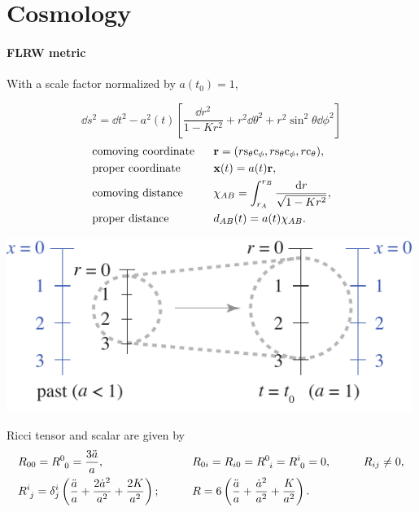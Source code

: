 \documentclass[CheatSheet]{subfiles}
\begin{document}
\summarystyle
\section{Cosmology}
\paragraph{FLRW metric} With a scale factor normalized by $a(t_0)=1$,\\
\begin{minipage}{0.6\textwidth}
\begin{equation}
  \dd s^2 = \dd t^2-a^2(t)\left[
  \frac{\dd r^2}{1-K r^2}+r^2\dd\theta^2+r^2\sin^2\theta\dd\phi^2
\right]
\end{equation}\vspace{-2em}
\begin{alignat*}{2}
  &\text{comoving coordinate~~}&& {\mathbf{r}}=(r\mathrm{s}_{\theta}\mathrm{c}_{\phi},r\mathrm{s}_{\theta}\mathrm{c}_{\phi},r\mathrm{c}_{\theta}),\\
  &\text{proper coordinate~~}&& {\mathbf{x}}(t)=a(t){\mathbf{r}},\\
  &\text{comoving distance~~}&& \chi_{AB}=\int_{r_A}^{r_B}\frac{{\mathrm{d}} r}{\sqrt{1-Kr^2}},\\
  &\text{proper distance~~}&& d_{AB}(t)=a(t)\chi_{AB}.
\end{alignat*}
\end{minipage}
\begin{minipage}{0.39\textwidth}
\hfill\includegraphics[width=0.99\textwidth]{figs/expansion.pdf}
\end{minipage}

\vspace{0.5em}

Ricci tensor and scalar are given by
\begin{alignat}{3}
 &R_{00}=\tensor{R}{^0_0}=\frac{3\ddot a}{a}, \qquad&
 &R_{0i}=R_{i0}=\tensor{R}{^0_i} = \tensor{R}{^i_0}=0, \qquad&
 &R_{ij}\neq 0,\notag
\\
 &\tensor{R}{^i_j} = \delta^i_j\left(\frac{\ddot a}{a} + \frac{2\dot a^2}{a^2} + \frac{2K}{a^2}\right);\qquad&
 &R = 6\left(\frac{\ddot a}{a} + \frac{\dot a^2}{a^2} + \frac{K}{a^2}\right).
\end{alignat}
\end{document}

